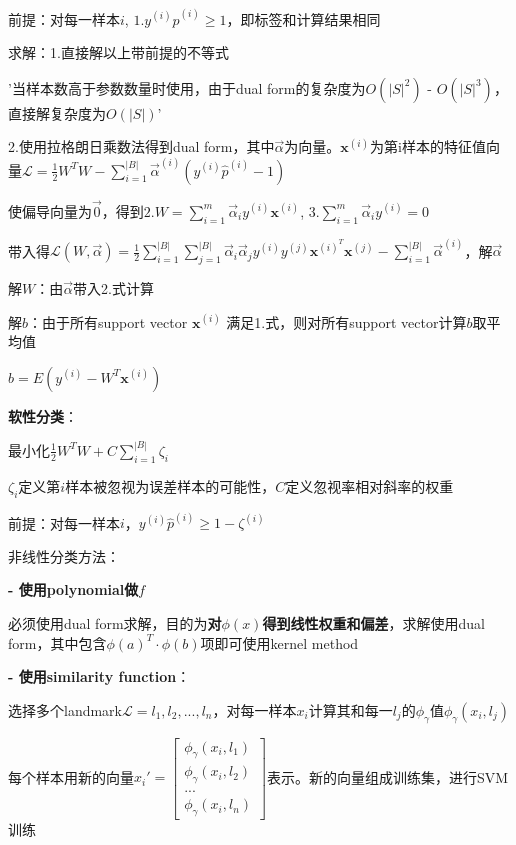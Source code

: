 \documentclass[UTF8]{ctexart}
\begin{document}
  \quad \quad 前提：对每一样本$i$, $1.y^{(i)}\hat{p}^{(i)} \geq 1$，即标签和计算结果相同

  \quad \quad 求解：1.直接解以上带前提的不等式

  \quad \quad \quad '当样本数高于参数数量时使用，由于dual form的复杂度为$O(|S|^2)$ - $O(|S|^3)$，直接解复杂度为$O(|S|)$'
  
  \quad \quad 2.使用拉格朗日乘数法得到dual form，其中$\vec{\alpha}$为向量。$\textbf{x}^{(i)}$为第i样本的特征值向量$\mathcal{L} = \frac{1}{2}W^TW - \sum_{i=1}^{|B|}\vec{\alpha}^{(i)}(y^{(i)}\hat{p}^{(i)} - 1)$

  \quad \quad \quad 使偏导向量为$\vec{0} $，得到$2.W = \sum_{i=1}^{m}\vec{\alpha}_iy^{(i)}\textbf{x}^{(i)}$, $3.\sum_{i=1}^{m}\vec{\alpha}_iy^{(i)}=0$

  \quad \quad \quad 带入得$\mathcal{L} (W, \vec{\alpha}) = \frac{1}{2}\sum_{i=1}^{|B|}\sum_{j=1}^{|B|}\vec{\alpha}_i\vec{\alpha}_jy^{(i)}y^{(j)}\textbf{x}^{(i)^T}\textbf{x}^{(j)} - \sum_{i=1}^{|B|}\vec{\alpha}^{(i)}$，解$\vec{\alpha}$

  \quad \quad \quad 解$W$：由$\vec{\alpha}$带入2.式计算

  \quad \quad \quad 解$b$：由于所有support vector $\textbf{x}^{(i)}$ 满足1.式，则对所有support vector计算$b$取平均值

  \quad \quad \quad \quad $b = E(y^{(i)}-W^T\textbf{x}^{(i)})$
  
  \quad \textbf{软性分类}：

  \quad \quad 最小化$\frac{1}{2}W^TW + C\sum_{i=1}^{|B|}\zeta_i $

  \quad \quad \quad $\zeta_i$定义第$i$样本被忽视为误差样本的可能性，$C$定义忽视率相对斜率的权重

  \quad \quad 前提：对每一样本$i$，$y^{(i)}\hat{p}^{(i)} \geq 1 - \zeta^{(i)}$

  非线性分类方法：

  \textbf{- 使用polynomial做$f$}

  \quad 必须使用dual form求解，目的为\textbf{对$\phi(x)$得到线性权重和偏差}，求解使用dual form，其中包含$\phi(a)^T \cdot \phi(b)$项即可使用kernel method

  \textbf{- 使用similarity function}：
  
  \quad 选择多个landmark$\mathcal{L} = l_1, l_2, ..., l_n$，对每一样本$x_i$计算其和每一$l_j$的$\phi_{\gamma}$值$\phi_{\gamma}(x_i, l_j)$

  \quad 每个样本用新的向量$x_i' = \begin{bmatrix}
    \phi_{\gamma}(x_i, l_1) \\
    \phi_{\gamma}(x_i, l_2) \\
    ... \\
    \phi_{\gamma}(x_i, l_n)
  \end{bmatrix}$表示。新的向量组成训练集，进行SVM训练
\end{document}
